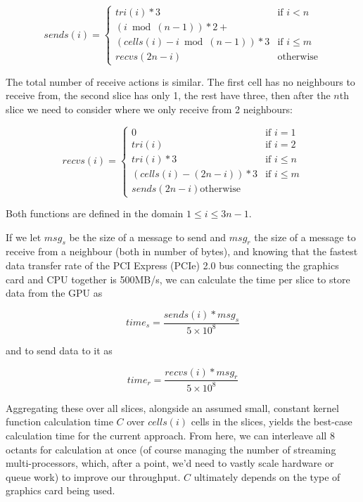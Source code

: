 \documentclass[conference]{IEEEtran}
\begin{document}
\begin{equation}
sends(i) = \left\{
	\begin{array}{ll}
		tri(i) * 3 & \mbox{if } i < n \\
		(i\bmod(n - 1)) * 2 + \\
			(cells(i) - i\bmod(n - 1)) * 3 & \mbox{if } i \le m \\
		recvs(2n - i) & \mbox{otherwise}
	\end{array}
\right.
\end{equation}

The total number of receive actions is similar. The first cell has no neighbours to receive from, the second slice has only 1, the rest have three, then after the $n$th slice we need to consider where we only receive from 2 neighbours:

\begin{equation}
recvs(i) = \left\{
	\begin{array}{ll}
		0 & \mbox{if } i = 1 \\
		tri(i) & \mbox{if } i = 2 \\
		tri(i) * 3 & \mbox{if } i \le n \\
		(cells(i) - (2n - i)) * 3 & \mbox{if } i \le m \\
		sends(2n - i) \mbox{otherwise}
	\end{array}
\right.
\end{equation}

Both functions are defined in the domain $ 1 \le i \le 3n - 1 $.

If we let $ msg_s $ be the size of a message to send and $ msg_r $ the size of a message to receive from a neighbour (both in number of bytes), and knowing that the fastest data transfer rate of the PCI Express (PCIe) 2.0 bus connecting the graphics card and CPU together is 500MB/s\cite{PCIe}, we can calculate the time per slice to store data from the GPU as

\begin{equation}
time_s = \frac{sends(i) * msg_s}{5 \times 10^8}
\end{equation}

and to send data to it as

\begin{equation}
time_r = \frac{recvs(i) * msg_r}{5 \times 10^8}
\end{equation}

Aggregating these over all slices, alongside an assumed small, constant kernel function calculation time $ C $ over $ cells(i) $ cells in the slices, yields the best-case calculation time for the current approach. From here, we can interleave all 8 octants for calculation at once (of course managing the number of streaming multi-processors, which, after a point, we'd need to vastly scale hardware or queue work) to improve our throughput. $C$ ultimately depends on the type of graphics card being used.
\end{document}
